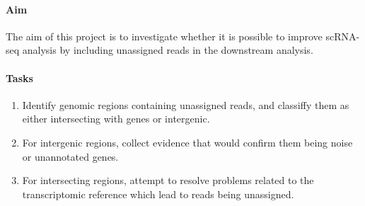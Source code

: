 \paragraph{\textbf{Aim}}

The aim of this project is to investigate whether it is possible to improve scRNA-seq analysis
by including unassigned reads in the downstream analysis.

\paragraph{\textbf{Tasks}}

\begin{enumerate}
  \item Identify genomic regions containing unassigned reads, and classiffy them as either intersecting with genes or intergenic.
  \item For intergenic regions, collect evidence that would confirm them being noise or unannotated genes.
  \item For intersecting regions, attempt to resolve problems related to the transcriptomic reference
  which lead to reads being unassigned.
\end{enumerate}
